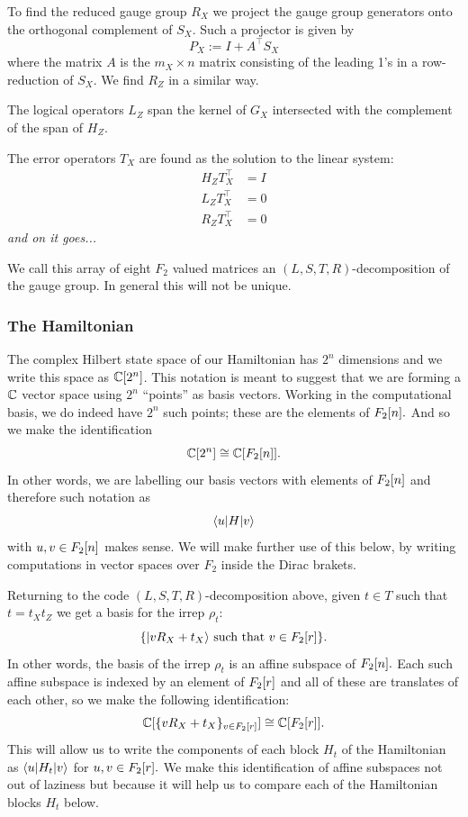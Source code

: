 \documentclass[12pt]{article}
\begin{document}
To find the reduced gauge group $R_X$ we project the gauge
group generators onto the orthogonal complement of $S_X.$
Such a projector is given by
$$
    P_X := I + A^\top S_X
$$
where the matrix $A$ is the $m_X\times n$ matrix consisting of
the leading 1's in a row-reduction of $S_X.$
We find $R_Z$ in a similar way.

The logical operators $L_Z$ 
span the kernel of $G_X$ intersected with the complement
of the span of $H_Z.$

The error operators $T_X$ are found as the solution
to the linear system:
\begin{align*}
    H_Z T_X^\top &= I \\
    L_Z T_X^\top &= 0 \\
    R_Z T_X^\top &= 0
\end{align*}
\emph{and on it goes...}

We call this array of eight $F_2$
valued matrices 
an $(L,S,T,R)$-decomposition of the gauge group.
In general this will not be unique.

\subsubsection{The Hamiltonian}

The complex Hilbert state space of our
Hamiltonian has $2^n$ dimensions and we
write this space as $\mathbb{C}[2^n]$.
This notation is meant to suggest that
we are forming a $\mathbb{C}$ vector space
using $2^n$ ``points'' 
as basis vectors.
Working in the computational basis,
we do indeed have $2^n$ such points; 
these are the elements of $F_2[n].$
And so we make the identification
$$
    \mathbb{C}[2^n] \cong \mathbb{C}[F_2[n]].
$$
In other words, we are labelling 
our basis vectors with elements of $F_2[n]$
and therefore such notation as
$$
    \langle{u}| H |{v}\rangle
$$
with $u, v \in F_2[n]$ makes sense.
We will make further use of this below,
by writing computations in vector
spaces over $F_2$ inside the Dirac brakets.

Returning to the code $(L,S,T,R)$-decomposition
above,
given $t\in T$ such that $t = t_X t_Z$
we get a basis for the irrep $\rho_t$:
$$
    \{ |{v R_X + t_X}\rangle \ \mbox{such that}\  v \in F_2[r] \}.
$$
In other words,
the basis of the irrep $\rho_t$ is 
an affine subspace of $F_2[n].$
Each such affine subspace is indexed by an
element of $F_2[r]$ and
all of these are
translates of each other,
so we make the following identification:
$$
\mathbb{C}[\{vR_X+t_X\}_{v\in F_2[r]}]
\cong \mathbb{C}[F_2[r]].
$$
This will allow us to write the components
of each block $H_t$ of the Hamiltonian
as $\langle{u}|H_t|{v}\rangle$ for $u,v\in F_2[r].$
We make this identification of affine subspaces
not out of laziness but because it will
help us to compare each of
the Hamiltonian blocks $H_t$ below.
\end{document}
